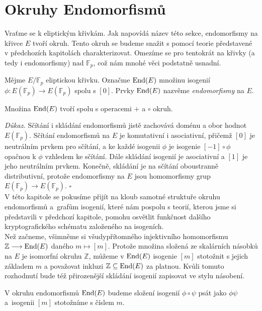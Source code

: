 \documentclass [12pt]{report}
\begin{document}
\chapter{Okruhy Endomorfismů} 
 
Vraťme se k eliptickým křivkám. Jak napovídá název této sekce, endomorfismy na křivce $E$ tvoří okruh. Tento okruh se budeme snažit s pomocí teorie představené v předchozích kapitolách charakterizovat. Omezíme se pro tentokrát na křivky (a tedy i endomorfismy) nad $\mathbb{F}_p$, což nám mnohé věci podstatně usnadní.
\begin{definice}
Mějme $E/\mathbb{F}_p$ eliptickou křivku. Označme $\operatorname{End}(E)$ množinu isogenií $\phi : E(\mathbb{F}_p) \longrightarrow E(\mathbb{F}_p)$ spolu s $[0]$. Prvky $\operatorname{End}(E)$ nazvěme \textit{endomorfismy} na $E$.
\end{definice}

\begin{veta}
Množina $\operatorname{End}(E)$ tvoří spolu s operacemi $+$ a $\circ$ okruh.
\end{veta}
\noindent \textit{Důkaz.} Sčítání i skládání endomorfismů jistě zachovává doménu a obor hodnot $E(\mathbb{F}_p)$. Sčítání endomorfismů na $E$ je komutativní i asociativní, přičemž $[0]$ je neutrálním prvkem pro sčítání, a ke každé isogenii $\phi$ je isogenie $[-1] \circ \phi$ opačnou k $\phi$ vzhledem ke sčítání. Dále skládání isogenií je asociativní a $[1]$ je jeho neutrálním prvkem. Konečně, skládání je na sčítání oboustranně distributivní, protože endomorfismy na $E$ jsou homomorfismy grup $E(\mathbb{F}_p) \longrightarrow E(\mathbb{F}_p)$. \hfill $\square$\\

V této kapitole se pokusíme přijít na kloub samotné struktuře okruhu endomorfismů a~grafům isogenií, které nám pospolu s teorií, kterou jsme si představili v předchozí kapitole, pomohu osvětlit funkčnost dalšího kryptografického schématu založeného na isogeních.\\

Než začneme, všimněme si všudypřítomného injektivního homomorfismu $\mathbb{Z} \longrightarrow \operatorname{End}(E)$ daného $m \mapsto [m]$. Protože množina složená ze skalárních násobků na $E$ je isomorfní okruhu $\mathbb{Z}$, můžeme v $\operatorname{End}(E)$ isogenie $[m]$ stotožnit s jejich základem $m$ a považovat inkluzi $\mathbb{Z} \subseteq \operatorname{End}(E)$ za platnou. Kvůli tomuto rozhodnutí bude též přirozenější skládání isogenií zapisovat ve stylu násobení.

\begin{umluva}
V okruhu endomorfismů $\operatorname{End}(E)$ budeme složení isogenií $\phi \circ \psi$ psát jako $\phi \psi$ a~isogenii $[m]$ stotožníme s číslem $m$.
\end{umluva}
\end{document}
